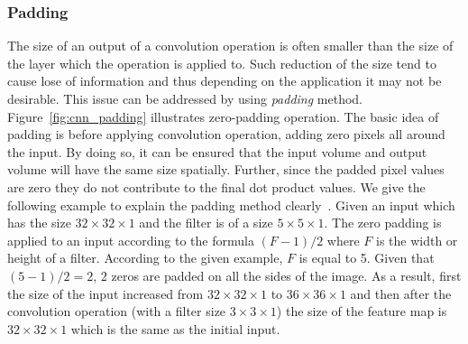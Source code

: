 \subsubsection{Padding} \label{subsec:padding}
The size of an output of a convolution operation is often smaller than the size of the layer which the operation is applied to. Such reduction of the size tend to cause lose of information and thus depending on the application it may not be desirable. This issue can be addressed by using \textit{padding} method. Figure~\ref{fig:cnn_padding} illustrates zero-padding operation. The basic idea of padding is before applying convolution operation, adding zero pixels all around the input. By doing so, it can be ensured that the input volume and output volume will have the same size spatially. Further, since the padded pixel values are zero they do not contribute to the final dot product values. We give the following example to explain the padding method clearly~\cite{goodfellow2016deep}. Given an input which has the size $32\times32\times1$ and the filter is of a size $5\times5\times1$. The zero padding is applied to an input according to the formula $(F-1)/2$ where $F$ is the width or height of a filter. According to the given example, $F$ is equal to 5. Given that $(5-1)/2=2$,  $2$ zeros are padded on all the sides of the image. As a result, first the size of the input increased from $32\times32\times1$ to $36\times36\times1$ and then after the convolution operation (with a filter size $3\times3\times1$) the size of the feature map is $32\times32\times1$ which is the same as the initial input.




